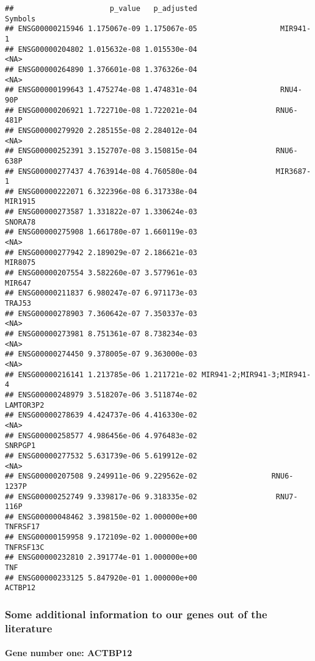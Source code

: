 \documentclass[]{article}
\let\oldparagraph\paragraph
\renewcommand{\paragraph}[1]{\oldparagraph{#1}\mbox{}}
\begin{document}
\begin{verbatim}
##                      p_value   p_adjusted                    Symbols
## ENSG00000215946 1.175067e-09 1.175067e-05                   MIR941-1
## ENSG00000204802 1.015632e-08 1.015530e-04                       <NA>
## ENSG00000264890 1.376601e-08 1.376326e-04                       <NA>
## ENSG00000199643 1.475274e-08 1.474831e-04                   RNU4-90P
## ENSG00000206921 1.722710e-08 1.722021e-04                  RNU6-481P
## ENSG00000279920 2.285155e-08 2.284012e-04                       <NA>
## ENSG00000252391 3.152707e-08 3.150815e-04                  RNU6-638P
## ENSG00000277437 4.763914e-08 4.760580e-04                  MIR3687-1
## ENSG00000222071 6.322396e-08 6.317338e-04                    MIR1915
## ENSG00000273587 1.331822e-07 1.330624e-03                    SNORA78
## ENSG00000275908 1.661780e-07 1.660119e-03                       <NA>
## ENSG00000277942 2.189029e-07 2.186621e-03                    MIR8075
## ENSG00000207554 3.582260e-07 3.577961e-03                     MIR647
## ENSG00000211837 6.980247e-07 6.971173e-03                     TRAJ53
## ENSG00000278903 7.360642e-07 7.350337e-03                       <NA>
## ENSG00000273981 8.751361e-07 8.738234e-03                       <NA>
## ENSG00000274450 9.378005e-07 9.363000e-03                       <NA>
## ENSG00000216141 1.213785e-06 1.211721e-02 MIR941-2;MIR941-3;MIR941-4
## ENSG00000248979 3.518207e-06 3.511874e-02                  LAMTOR3P2
## ENSG00000278639 4.424737e-06 4.416330e-02                       <NA>
## ENSG00000258577 4.986456e-06 4.976483e-02                    SNRPGP1
## ENSG00000277532 5.631739e-06 5.619912e-02                       <NA>
## ENSG00000207508 9.249911e-06 9.229562e-02                 RNU6-1237P
## ENSG00000252749 9.339817e-06 9.318335e-02                  RNU7-116P
## ENSG00000048462 3.398150e-02 1.000000e+00                   TNFRSF17
## ENSG00000159958 9.172109e-02 1.000000e+00                  TNFRSF13C
## ENSG00000232810 2.391774e-01 1.000000e+00                        TNF
## ENSG00000233125 5.847920e-01 1.000000e+00                    ACTBP12
\end{verbatim}

\subsubsection{Some additional information to our genes out of the
literature}\label{some-additional-information-to-our-genes-out-of-the-literature}

\paragraph{Gene number one: ACTBP12}\label{gene-number-one-actbp12}
\end{document}
